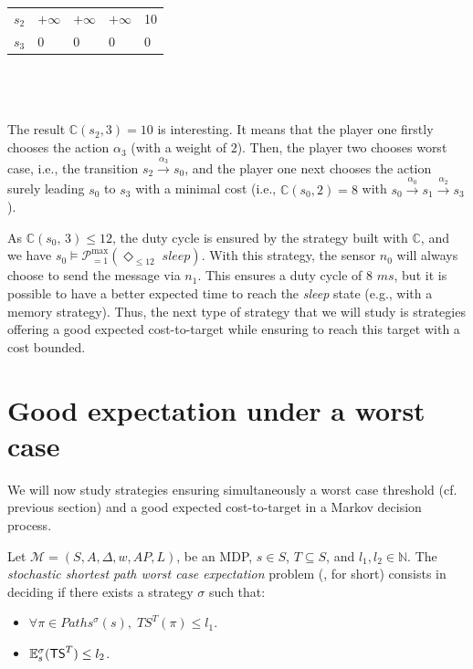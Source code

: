 \begin{example}
\begin{minipage}{0.5\linewidth}
\begin{tabular}{l|llll}
$s_2$  & $+\infty$ & $+\infty$ & $+\infty$ & 10    \\
$s_3$  & 0         & 0         & 0         & 0
\end{tabular}
\captionsetup{justification=centering}
\end{minipage}
\\$ $\\$ $\\
The result $\mathbb{C}(s_2,3)=10$ is interesting. It means that the player one firstly chooses the action $\alpha_3$ (with a weight of $2$).
Then, the player two chooses worst case, i.e., the transition $s_2 \xrightarrow{\alpha_3}s_0$, and the player one next chooses the action surely leading $s_0$ to $s_3$ with a minimal cost (i.e., $\mathbb{C}(s_0, 2)=8$ with $s_0\xrightarrow{\alpha_0}s_1\xrightarrow{\alpha_2}s_3$).
\par As $\mathbb{C}(s_0,\, 3) \leq 12$, the duty cycle is ensured by the strategy built with $\mathbb{C}$, and we have $s_0 \models \mathcal{P}^{\max}_{=1}(\Diamond_{\leq 12}\; \textit{sleep})$.
With this strategy, the sensor $n_0$ will always choose to send the message via $n_1$.
This ensures a duty cycle of $8$ $ms$, but it is possible to have a better expected time to reach the \textit{sleep} state (e.g., with a memory strategy).
Thus, the next type of strategy that we will study is strategies offering a good expected cost-to-target while ensuring to reach this target with a cost bounded.
\end{example}

\section{Good expectation under a worst case}
We will now study strategies ensuring simultaneously a worst case threshold (cf. previous section) and a good expected cost-to-target in a Markov decision process.

\begin{definition}
    Let $\mathcal{M}=(S, A, \Delta, w, AP, L)$, be an MDP, $s \in S$, $T \subseteq S$, and $l_1, l_2 \in \mathbb{N}$.
    The \textit{stochastic shortest path worst case expectation} problem (\SSPWE{}, for short) consists in deciding if there exists a strategy $\sigma$ such that:
    \begin{itemize}
      \item $\forall \pi \in Paths^\sigma(s), \; TS^T(\pi) \leq l_1$.
      \item $\mathbb{E}_s^\sigma(\text{\sffamily TS}^T) \leq l_2$.
    \end{itemize}
\end{definition}

